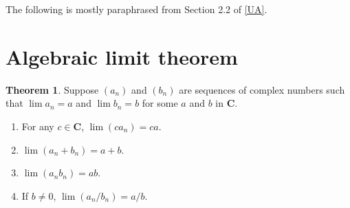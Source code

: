 \documentclass[12pt]{article}
\theoremstyle{definition}
\newtheorem{theorem}{Theorem}
\newcommand{\C}{\mathbf{C}}
\begin{document}
The following is mostly paraphrased from Section 2.2 of \hyperlink{ua}{[UA]}.

\section{Algebraic limit theorem}

\begin{theorem}
\label{thm:algebraic_limit_theorem}
    Suppose \( (a_n) \) and \( (b_n) \) are sequences of complex numbers such that \( \lim a_n = a \) and \( \lim b_n = b \) for some \( a \) and \( b \) in \( \C \).
    \begin{enumerate}
        \item For any \( c \in \C \), \( \lim (c a_n) = ca \).

        \item \( \lim (a_n + b_n) = a + b \).

        \item \( \lim (a_n b_n) = ab \).

        \item If \( b \neq 0 \), \( \lim(a_n/b_n) = a/b \).
    \end{enumerate}
\end{theorem}
\end{document}
